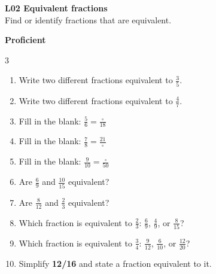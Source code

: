 \documentclass[17pt,a4paper,landscape]{extarticle}
\begin{document}
\sffamily
\boldmath

\boldmath

\boldmath

\boldmath

\boldmath

\boldmath





{\LARGE \textbf{L02 Equivalent fractions}}\\[0.35em]
Find or identify fractions that are equivalent.

\vspace{2.6em}
{\LARGE \textbf{Proficient}}
\begin{multicols}{3}
\begin{enumerate}[
  itemsep=8.8em,
  label=\textbf{\arabic*.}, 
  labelwidth=2.2em,
  labelsep=0.75em,
  leftmargin=!,
  align=left
]
\item Write two different fractions equivalent to $\frac{3}{5}$.
\item Write two different fractions equivalent to $\frac{4}{7}$.
\item Fill in the blank: $\frac{5}{6} = \frac{\square}{18}$
\item Fill in the blank: $\frac{7}{8} = \frac{21}{\square}$
\item Fill in the blank: $\frac{9}{10} = \frac{\square}{50}$
\item Are $\frac{6}{9}$ and $\frac{10}{15}$ equivalent?
\item Are $\frac{8}{12}$ and $\frac{2}{3}$ equivalent?
\item Which fraction is equivalent to $\frac{2}{3}$: $\frac{6}{9}$, $\frac{4}{9}$, or $\frac{8}{15}$?
\item Which fraction is equivalent to $\frac{3}{4}$: $\frac{9}{12}$, $\frac{6}{10}$, or $\frac{12}{20}$?
\item Simplify \textbf{12/16} and state a fraction equivalent to it.
\end{enumerate}
\end{multicols}
\end{document}
